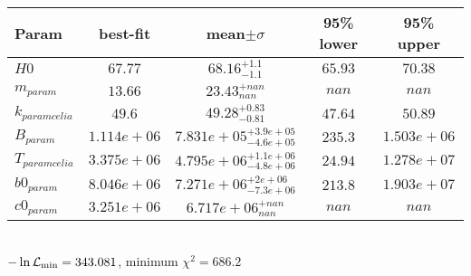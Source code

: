 \begin{tabular}{|l|c|c|c|c|} 
 \hline 
Param & best-fit & mean$\pm\sigma$ & 95\% lower & 95\% upper \\ \hline 
$H0$ &$67.77$ & $68.16_{-1.1}^{+1.1}$ & $65.93$ & $70.38$ \\ 
$m_{param }$ &$13.66$ & $23.43_{nan}^{+nan}$ & $nan$ & $nan$ \\ 
$k_{param celia }$ &$49.6$ & $49.28_{-0.81}^{+0.83}$ & $47.64$ & $50.89$ \\ 
$B_{param }$ &$1.114e+06$ & $7.831e+05_{-4.6e+05}^{+3.9e+05}$ & $235.3$ & $1.503e+06$ \\ 
$T_{param celia }$ &$3.375e+06$ & $4.795e+06_{-4.8e+06}^{+1.1e+06}$ & $24.94$ & $1.278e+07$ \\ 
$b0_{param }$ &$8.046e+06$ & $7.271e+06_{-7.3e+06}^{+2e+06}$ & $213.8$ & $1.903e+07$ \\ 
$c0_{param }$ &$3.251e+06$ & $6.717e+06_{nan}^{+nan}$ & $nan$ & $nan$ \\ 
\hline 
 \end{tabular} \\ 
$-\ln{\cal L}_\mathrm{min} =343.081$, minimum $\chi^2=686.2$ \\ 
